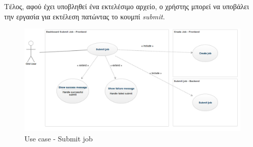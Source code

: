 Τέλος, αφού έχει υποβληθεί ένα εκτελέσιμο αρχείο, ο χρήστης μπορεί να υποβάλει την εργασία για εκτέλεση πατώντας το κουμπί \textit{submit}.

\begin{figure}[t]
\caption{Use case - Submit job}
\includegraphics[width=16cm]{../images/submit-job-case.png}
\centering
\end{figure}
\clearpage





